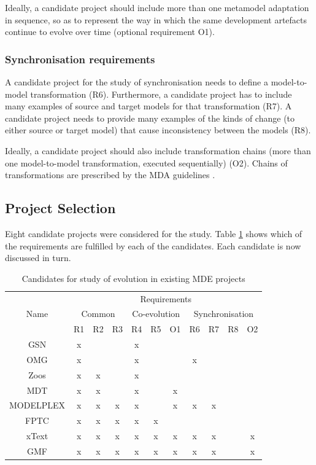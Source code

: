Ideally, a candidate project should include more than one metamodel adaptation in sequence, so as to represent the way in which the same development artefacts continue to evolve over time (optional requirement O1).

\subsubsection{Synchronisation requirements}
A candidate project for the study of synchronisation needs to define a model-to-model transformation (R6). Furthermore, a candidate project has to include many examples of source and target models for that transformation (R7). A candidate project needs to provide many examples of the kinds of change (to either source or target model) that cause inconsistency between the models (R8). 

Ideally, a candidate project should also include transformation chains (more than one model-to-model transformation, executed sequentially) (O2). Chains of transformations are prescribed by the MDA guidelines \cite{kleppe03mda}.


\subsection{Project Selection}
\label{subsec:project_selection}
Eight candidate projects were considered for the study. Table \ref{tab:candidates} shows which of the requirements are fulfilled by each of the candidates. Each candidate is now discussed in turn.

\begin{table}
	\caption{Candidates for study of evolution in existing MDE projects}
	\centering
	\begin{tabular}{|c||c|c|c||c|c|c||c|c|c|c|}
		\hline
		\multirow{3}{*}{Name} & \multicolumn{10}{|c|}{Requirements} \\
		\cline{2-11}
		          & \multicolumn{3}{|c||}{Common} & \multicolumn{3}{|c||}{Co-evolution} & \multicolumn{4}{|c|}{Synchronisation} \\
		\cline{2-11}
		          & R1 & R2 & R3 & R4 & R5 & O1 & R6 & R7 & R8 & O2 \\
		\hline
		GSN       & x  &    &    & x  &    &    &    &    &    &    \\
		\hline
		OMG       & x  &    &    & x  &    &    & x  &    &    &    \\
		\hline
		Zoos      & x  & x  &    & x  &    &    &    &    &    &    \\
		\hline
		MDT       & x  & x  &    & x  &    & x  &    &    &    &    \\
		\hline
		MODELPLEX & x  & x  & x  & x  &    & x  & x  & x  &    &    \\
		\hline
		FPTC      & x  & x  & x  & x  & x  &    &    &    &    &    \\
		\hline
		xText     & x  & x  & x  & x  & x  & x  & x  & x  &    & x  \\
		\hline
		GMF       & x  & x  & x  & x  & x  & x  & x  & x  &    & x  \\
		\hline
	\end{tabular}
	\label{tab:candidates}
\end{table}

